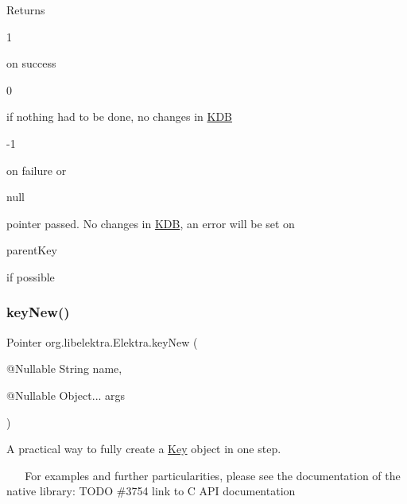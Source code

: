 \begin{DoxyReturn}{Returns}

\begin{DoxyItemize}
\item 
\begin{DoxyCode}
1 
\end{DoxyCode}
 on success 
\item 
\begin{DoxyCode}
0 
\end{DoxyCode}
 if nothing had to be done, no changes in \hyperlink{classorg_1_1libelektra_1_1KDB}{K\+DB} 
\item 
\begin{DoxyCode}
-1 
\end{DoxyCode}
 on failure or
\begin{DoxyCode}
null 
\end{DoxyCode}
 pointer passed. No changes in \hyperlink{classorg_1_1libelektra_1_1KDB}{K\+DB}, an error will be set on 
\begin{DoxyCode}
parentKey 
\end{DoxyCode}
 if possible 
\end{DoxyItemize}
\end{DoxyReturn}
\mbox{\label{interfaceorg_1_1libelektra_1_1Elektra_ae437441010a3a634a39107e37808cbd1}} 
\subsubsection{\texorpdfstring{key\+New()}{keyNew()}}
{\footnotesize\ttfamily Pointer org.\+libelektra.\+Elektra.\+key\+New (\begin{DoxyParamCaption}\item[{@Nullable String}]{name,  }\item[{@Nullable Object...}]{args }\end{DoxyParamCaption})}



A practical way to fully create a \hyperlink{classorg_1_1libelektra_1_1Key}{Key} object in one step. 

~\newline
 ~\newline
 For examples and further particularities, please see the documentation of the native library\+: T\+O\+DO \#3754 link to C A\+PI documentation

